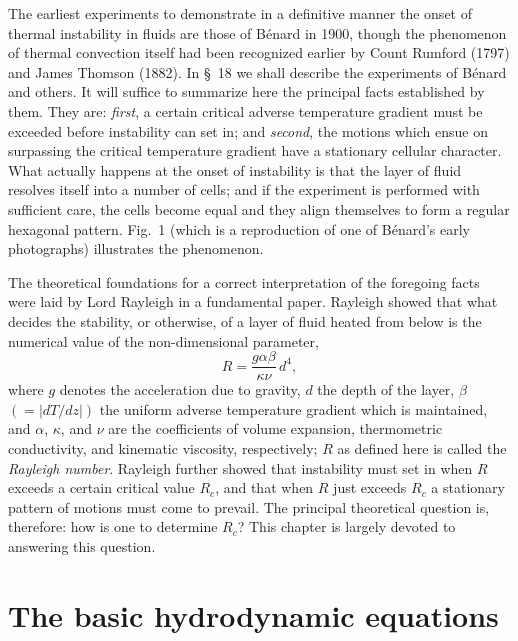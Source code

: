 The earliest experiments to demonstrate in a definitive manner the
onset of thermal instability in fluids are those of B\'enard in 1900, though
the phenomenon of thermal convection itself had been recognized earlier
by Count Rumford (1797) and James Thomson (1882). In \S~18 we shall
describe the experiments of B\'enard and others. It will suffice to summarize here the principal facts established by them. They are: \emph{first},
a certain critical adverse temperature gradient must be exceeded before
instability can set in; and \emph{second}, the motions which ensue on surpassing
the critical temperature gradient have a stationary cellular character.
What actually happens at the onset of instability is that the layer of
fluid resolves itself into a number of cells; and if the experiment is
performed with sufficient care, the cells become equal and they align
themselves to form a regular hexagonal pattern. Fig.~1 (which is a
reproduction of one of B\'enard's early photographs) illustrates the
phenomenon.


The theoretical foundations for a correct interpretation of the foregoing facts were laid by Lord Rayleigh in a fundamental paper. Rayleigh
showed that what decides the stability, or otherwise, of a layer of fluid
heated from below is the numerical value of the non-dimensional parameter,
\begin{equation}
\label{eq:2-1}
R = \frac{g\alpha\beta}{\kappa\nu}\,d^4,
\end{equation}
where $g$ denotes the acceleration due to gravity, $d$ the depth of the layer,
$\beta$ $(= |dT/dz|)$ the uniform adverse temperature gradient which is
maintained, and $\alpha$, $\kappa$, and $\nu$ are the coefficients of volume expansion,
thermometric conductivity, and kinematic viscosity, respectively; $R$ as
defined here is called the \emph{Rayleigh number}. Rayleigh further showed that
instability must set in when $R$ exceeds a certain critical value $R_c$, and
that when $R$ just exceeds $R_c$ a stationary pattern of motions must come
to prevail. The principal theoretical question is, therefore: how is one to
determine $R_c$? This chapter is largely devoted to answering this question.

\section{The basic hydrodynamic equations}\label{sec:7}

